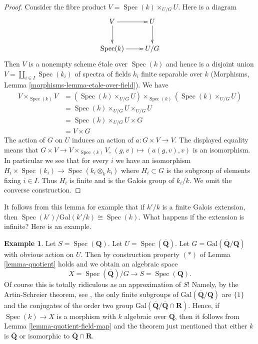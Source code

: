 \documentclass{stacks-project}
\theoremstyle{plain}
\theoremstyle{definition}
\newtheorem{example}[subsection]{Example}
\theoremstyle{remark}
\numberwithin{equation}{subsection}
\def\Spec{\mathop{\mathrm{Spec}}}
\begin{document}
\begin{proof}
Consider the fibre product $V = \Spec(k) \times_{U/G} U$.
Here is a diagram
$$
\xymatrix{
V \ar[r] \ar[d] & U \ar[d] \\
\Spec(k) \ar[r] & U/G
}
$$
Then $V$ is a nonempty scheme \'etale over $\Spec(k)$ and hence is a
disjoint union $V = \coprod_{i \in I} \Spec(k_i)$
of spectra of fields $k_i$ finite separable over $k$
(Morphisms, Lemma \ref{morphisms-lemma-etale-over-field}).
We have
\begin{align*}
V \times_{\Spec(k)} V
& =
(\Spec(k) \times_{U/G} U) \times_{\Spec(k)}(\Spec(k) \times_{U/G} U) \\
& = 
\Spec(k) \times_{U/G} U \times_{U/G} U \\
& =
\Spec(k) \times_{U/G} U \times G \\
& =
V \times G
\end{align*}
The action of $G$ on $U$ induces an action of $a : G \times V \to V$.
The displayed equality means that
$G \times V \to V \times_{\Spec(k)} V$, $(g, v) \mapsto (a(g, v), v)$
is an isomorphism. In particular we see that for every $i$ we have
an isomorphism $H_i \times \Spec(k_i) \to \Spec(k_i \otimes_k k_i)$
where $H_i \subset G$ is the subgroup of elements fixing $i \in I$.
Thus $H_i$ is finite and is the Galois group of $k_i/k$.
We omit the converse construction.
\end{proof}

\noindent
It follows from this lemma for example that
if $k'/k$ is a finite Galois extension, then
$\Spec(k')/\text{Gal}(k'/k) \cong \Spec(k)$.
What happens if the extension is infinite? Here is an example.

\begin{example}
\label{example-Qbar}
Let $S = \Spec(\mathbf{Q})$.
Let $U = \Spec(\overline{\mathbf{Q}})$.
Let $G = \text{Gal}(\overline{\mathbf{Q}}/\mathbf{Q})$ with obvious
action on $U$. Then by construction property $(*)$ of
Lemma \ref{lemma-quotient} holds and we obtain an algebraic space
$$
X = \Spec(\overline{\mathbf{Q}})/G
\longrightarrow
S = \Spec(\mathbf{Q}).
$$
Of course this is totally ridiculous as an approximation of $S$!
Namely, by the Artin-Schreier theorem,
see \cite[Theorem 17, page 316]{JacobsonIII},
the only finite subgroups of $\text{Gal}(\overline{\mathbf{Q}}/\mathbf{Q})$
are $\{1\}$ and the conjugates of the order two group
$\text{Gal}(\overline{\mathbf{Q}}/\overline{\mathbf{Q}} \cap \mathbf{R})$.
Hence, if
$\Spec(k) \to X$ is a morphism with $k$ algebraic over $\mathbf{Q}$,
then it follows from Lemma \ref{lemma-quotient-field-map} and the theorem
just mentioned that either $k$ is $\overline{\mathbf{Q}}$ or isomorphic to
$\overline{\mathbf{Q}} \cap \mathbf{R}$.
\end{example}
\end{document}
